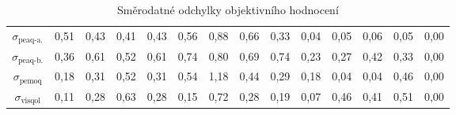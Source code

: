 \begin{table}[h]
\centering
\small
\begin{tabu}{|c|c|c|c|c|c|c|c|c|c|c|c|c|c|}
\hline
 &  &  &  &  &  &  &  &  &  &  &  &  &  \\ \hline
 $\sigma_{\text{peaq-a.}}$ & 0,51 & 0,43 & 0,41 & 0,43 & 0,56 & 0,88 & 0,66 & 0,33 & 0,04 & 0,05 & 0,06 & 0,05 & 0,00 \\ \hline
$\sigma_{\text{peaq-b.}}$ & 0,36 & 0,61 & 0,52 & 0,61 & 0,74 & 0,80 & 0,69 & 0,74 & 0,23 & 0,27 & 0,42 & 0,33 & 0,00 \\ \hline
$\sigma_{\text{pemoq}}$ & 0,18 & 0,31 & 0,52 & 0,31 & 0,54 & 1,18 & 0,44 & 0,29 & 0,18 & 0,04 & 0,04 & 0,46 & 0,00 \\ \hline
$\sigma_{\text{visqol}}$ & 0,11 & 0,28 & 0,63 & 0,28 & 0,15 & 0,72 & 0,28 & 0,19 & 0,07 & 0,46 & 0,41 & 0,51 & 0,00 \\ \hline
\end{tabu}
\caption{Směrodatné odchylky objektivního hodnocení}
\label{table:sigma}
\end{table}


